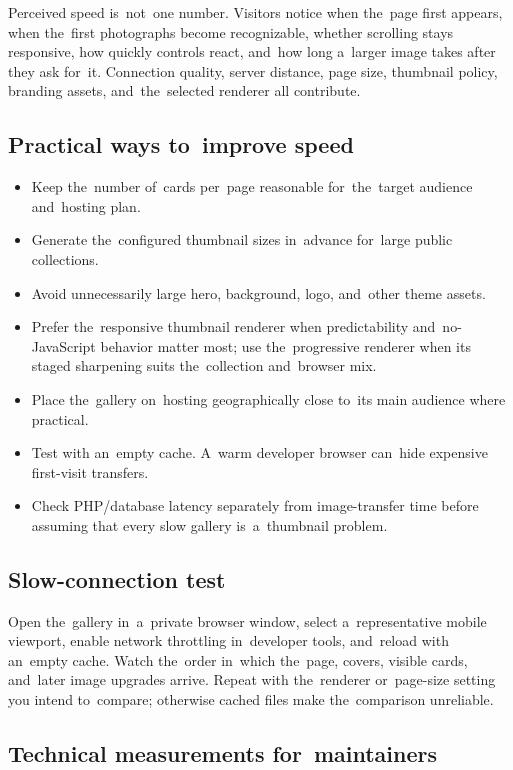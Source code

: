 \documentclass[11pt,a4paper]{article}
\begin{document}
Perceived speed is~not~one number. Visitors notice when the~page first appears,
when the~first photographs become recognizable, whether scrolling stays
responsive, how quickly controls react, and~how long a~larger image takes after
they ask for~it. Connection quality, server distance, page size, thumbnail
policy, branding assets, and~the~selected renderer all contribute.

\subsection{Practical ways to~improve speed}

\begin{itemize}
  \item Keep the~number of~cards per~page reasonable for~the~target audience
  and~hosting plan.
  \item Generate the~configured thumbnail sizes in~advance for~large public
  collections.
  \item Avoid unnecessarily large hero, background, logo, and~other theme
  assets.
  \item Prefer the~responsive thumbnail renderer when predictability
  and~no-JavaScript behavior matter most; use the~progressive renderer when its
  staged sharpening suits the~collection and~browser mix.
  \item Place the~gallery on~hosting geographically close to~its main audience
  where practical.
  \item Test with an~empty cache. A~warm developer browser can~hide expensive
  first-visit transfers.
  \item Check PHP/database latency separately from image-transfer time before
  assuming that every slow gallery is~a~thumbnail problem.
\end{itemize}

\subsection{Slow-connection test}

Open the~gallery in~a~private browser window, select a~representative mobile
viewport, enable network throttling in~developer tools, and~reload with an~empty
cache. Watch the~order in~which the~page, covers, visible cards, and~later image
upgrades arrive. Repeat with the~renderer or~page-size setting you intend
to~compare; otherwise cached files make the~comparison unreliable.

\subsection{Technical measurements for~maintainers}
\end{document}
